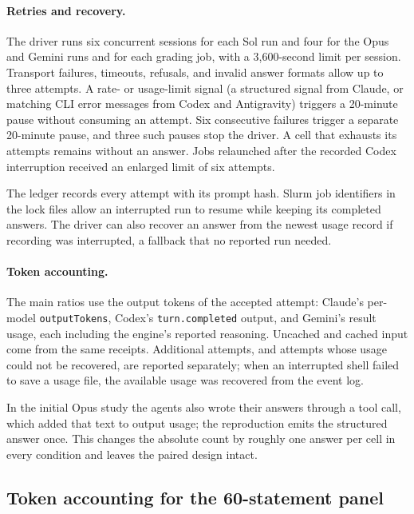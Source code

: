 \paragraph{Retries and recovery.}
The driver runs six concurrent sessions for each Sol run and four for the Opus and Gemini runs and for each grading job, with a 3{,}600-second limit per session. Transport failures, timeouts, refusals, and invalid answer formats allow up to three attempts. A rate- or usage-limit signal (a structured signal from Claude, or matching CLI error messages from Codex and Antigravity) triggers a 20-minute pause without consuming an attempt. Six consecutive failures trigger a separate 20-minute pause, and three such pauses stop the driver. A cell that exhausts its attempts remains without an answer. Jobs relaunched after the recorded Codex interruption received an enlarged limit of six attempts.

The ledger records every attempt with its prompt hash. Slurm job identifiers in the lock files allow an interrupted run to resume while keeping its completed answers. The driver can also recover an answer from the newest usage record if recording was interrupted, a fallback that no reported run needed.

\paragraph{Token accounting.}
The main ratios use the output tokens of the accepted attempt: Claude's per-model \texttt{outputTokens}, Codex's \texttt{turn.completed} output, and Gemini's result usage, each including the engine's reported reasoning. Uncached and cached input come from the same receipts. Additional attempts, and attempts whose usage could not be recovered, are reported separately; when an interrupted shell failed to save a usage file, the available usage was recovered from the event log.

In the initial Opus study the agents also wrote their answers through a tool call, which added that text to output usage; the reproduction emits the structured answer once. This changes the absolute count by roughly one answer per cell in every condition and leaves the paired design intact.

\subsection{Token accounting for the 60-statement panel}
\label{app:claims60-corrected-accounting}

